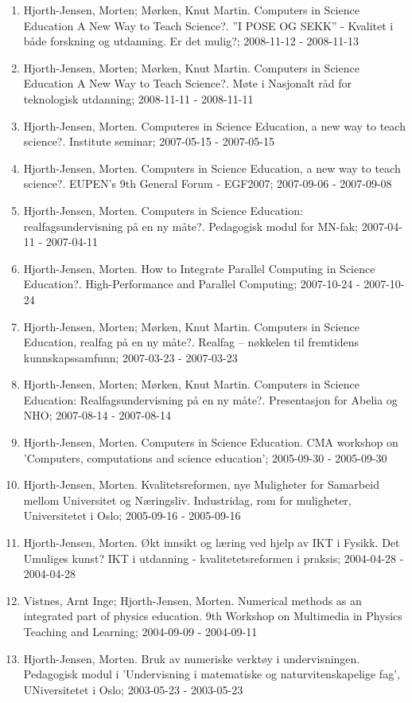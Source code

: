 \documentclass[aps,floatfix,preprint]{revtex4-1}
\begin{document}
\begin{enumerate}
\item Hjorth-Jensen, Morten; Mørken, Knut Martin.  Computers in Science Education A New Way to Teach Science?. ”I POSE OG SEKK” - Kvalitet i både forskning og utdanning. Er det mulig?; 2008-11-12 - 2008-11-13

\item Hjorth-Jensen, Morten; Mørken, Knut Martin.  Computers in Science Education A New Way to Teach Science?. Møte i Nasjonalt råd for teknologisk utdanning; 2008-11-11 - 2008-11-11

\item Hjorth-Jensen, Morten.  Computeres in Science Education, a new way to teach science?. Institute seminar; 2007-05-15 - 2007-05-15

\item Hjorth-Jensen, Morten.  Computers in Science Education, a new way to teach science?. EUPEN's 9th General Forum - EGF2007; 2007-09-06 - 2007-09-08

\item Hjorth-Jensen, Morten.  Computers in Science Education: realfagsundervisning på en ny måte?. Pedagogisk modul for MN-fak; 2007-04-11 - 2007-04-11

\item Hjorth-Jensen, Morten.  How to Integrate Parallel Computing in Science Education?. High-Performance and Parallel Computing; 2007-10-24 - 2007-10-24

\item Hjorth-Jensen, Morten; Mørken, Knut Martin. Computers in Science Education, realfag på en ny måte?. Realfag – nøkkelen til fremtidens kunnskapssamfunn; 2007-03-23 - 2007-03-23

\item Hjorth-Jensen, Morten; Mørken, Knut Martin.  Computers in Science Education: Realfagsundervisning på en ny måte?. Presentasjon for Abelia og NHO; 2007-08-14 - 2007-08-14

\item Hjorth-Jensen, Morten.  Computers in Science Education. CMA workshop on 'Computers, computations and science education'; 2005-09-30 - 2005-09-30

\item Hjorth-Jensen, Morten.  Kvalitetsreformen, nye Muligheter for Samarbeid mellom Universitet og Næringsliv. Industridag, rom for muligheter, Universitetet i Oslo; 2005-09-16 - 2005-09-16

\item Hjorth-Jensen, Morten. Økt innsikt og læring ved hjelp av IKT i Fysikk. Det Umuliges kunst? IKT i utdanning - kvalitetetsreformen i praksis; 2004-04-28 - 2004-04-28

\item Vistnes, Arnt Inge; Hjorth-Jensen, Morten. Numerical methods as an integrated part of physics education. 9th Workshop on Multimedia in Physics Teaching and Learning; 2004-09-09 - 2004-09-11

\item Hjorth-Jensen, Morten. Bruk av numeriske verktøy i undervisningen. Pedagogisk modul i 'Undervisning i matematiske og naturvitenskapelige fag', UNiversitetet i Oslo; 2003-05-23 - 2003-05-23
\end{enumerate}
\end{document}
